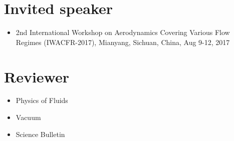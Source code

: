 \documentclass[11pt,a4paper,english]{moderncv}
\begin{document}
\section{Invited speaker}
\begin{itemize}
    \item 2nd International Workshop on Aerodynamics Covering Various Flow Regimes (IWACFR-2017),
        Mianyang, Sichuan, China, Aug 9-12, 2017
\end{itemize}

\section{Reviewer}
\begin{itemize}
    \item Physics of Fluids
    \item Vacuum
    \item Science Bulletin
\end{itemize}

\nocite{*}
\printbibliography[title=Main Publications, keyword=primary, resetnumbers=true]
\printbibliography[title=Other Publications, keyword=secondary, resetnumbers=true]
\end{document}
